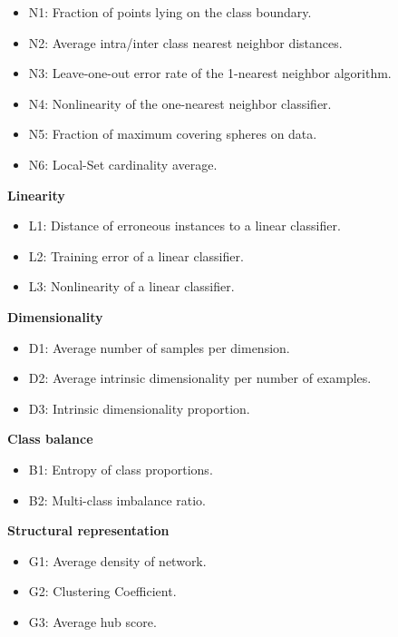 \begin{itemize}
    \item N1: Fraction of points lying on the class boundary.
    \item N2: Average intra/inter class nearest neighbor distances.
    \item N3: Leave-one-out error rate of the 1-nearest neighbor algorithm.
    \item N4: Nonlinearity of the one-nearest neighbor classifier.
    \item N5: Fraction of maximum covering spheres on data.
    \item N6: Local-Set cardinality average.
\end{itemize}

\textbf{Linearity}

\begin{itemize}
    \item L1: Distance of erroneous instances to a linear classifier.
    \item L2: Training error of a linear classifier.
    \item L3: Nonlinearity of a linear classifier.
\end{itemize}

\textbf{Dimensionality}

\begin{itemize}
    \item D1: Average number of samples per dimension.
    \item D2: Average intrinsic dimensionality per number of examples.
    \item D3: Intrinsic dimensionality proportion.
\end{itemize}

\textbf{Class balance}

\begin{itemize}
    \item B1: Entropy of class proportions.
    \item B2: Multi-class imbalance ratio.
\end{itemize}

\textbf{Structural representation}

\begin{itemize}
    \item G1: Average density of network.
    \item G2: Clustering Coefficient.
    \item G3: Average hub score.
\end{itemize}

